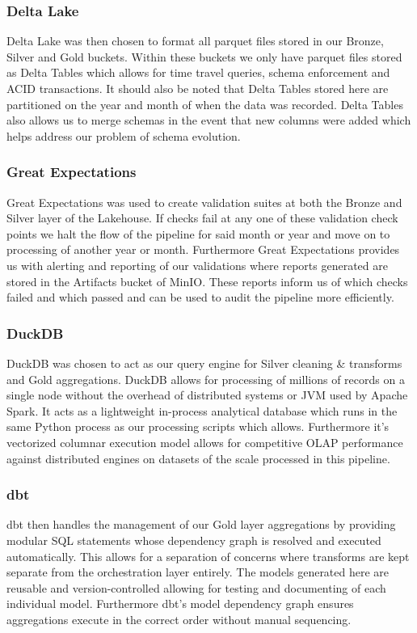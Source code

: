 \documentclass[conference]{IEEEtran}
\begin{document}
\subsubsection{Delta Lake}
Delta Lake \cite{armbrust2020deltalake} was then chosen to format all parquet files stored in our Bronze, Silver and Gold buckets. Within these buckets we only have parquet files stored as Delta Tables which allows for time travel queries, schema enforcement and ACID transactions. It should also be noted that Delta Tables stored here are partitioned on the year and month of when the data was recorded. Delta Tables also allows us to merge schemas in the event that new columns were added which helps address our problem of schema evolution.

\subsubsection{Great Expectations}
Great Expectations \cite{ge_docs} was used to create validation suites at both the Bronze and Silver layer of the Lakehouse. If checks fail at any one of these validation check points we halt the flow of the pipeline for said month or year and move on to processing of another year or month. Furthermore Great Expectations provides us with alerting and reporting of our validations where reports generated are stored in the Artifacts bucket of MinIO. These reports inform us of which checks failed and which passed and can be used to audit the pipeline more efficiently.

\subsubsection{DuckDB}
DuckDB \cite{raasveldt2019duckdb} was chosen to act as our query engine for Silver cleaning \& transforms and Gold aggregations. DuckDB allows for processing of millions of records on a single node without the overhead of distributed systems or JVM used by Apache Spark. It acts as a lightweight in-process analytical database which runs in the same Python process as our processing scripts which allows. Furthermore it's vectorized columnar execution model allows for competitive OLAP performance against distributed engines on datasets of the scale processed in this pipeline.

\subsubsection{dbt}
dbt \cite{dbt_docs} then handles the management of our Gold layer aggregations by providing modular SQL statements whose dependency graph is resolved and executed automatically. This allows for a separation of concerns where transforms are kept separate from the orchestration layer entirely. The models generated here are reusable and version-controlled allowing for testing and documenting of each individual model. Furthermore dbt's model dependency graph ensures aggregations execute in the correct order without manual sequencing.
\end{document}
